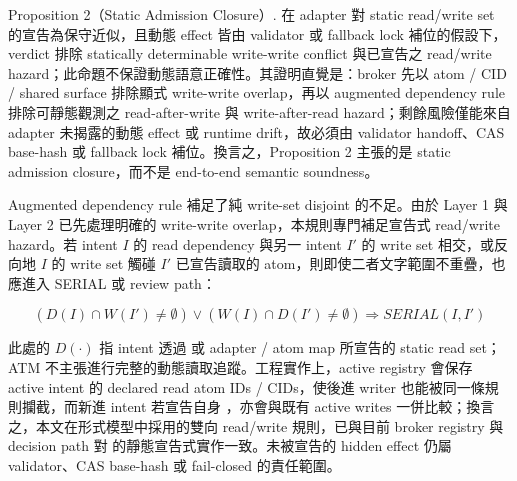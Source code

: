 \documentclass[a4paper,fontset=none]{ctexart}
\begin{document}
Proposition 2（Static Admission Closure）. 在 adapter 對 static read/write set 的宣告為保守近似，且動態 effect 皆由 validator 或 fallback lock 補位的假設下，\texttt{} verdict 排除 statically determinable write-write conflict 與已宣告之 read/write hazard；此命題不保證動態語意正確性。其證明直覺是：broker 先以 atom / CID / shared surface 排除顯式 write-write overlap，再以 augmented dependency rule 排除可靜態觀測之 read-after-write 與 write-after-read hazard；剩餘風險僅能來自 adapter 未揭露的動態 effect 或 runtime drift，故必須由 validator handoff、CAS base-hash 或 fallback lock 補位。換言之，Proposition 2 主張的是 static admission closure，而不是 end-to-end semantic soundness。

Augmented dependency rule 補足了純 write-set disjoint 的不足。由於 Layer 1 與 Layer 2 已先處理明確的 write-write overlap，本規則專門補足宣告式 read/write hazard。若 intent $I$ 的 read dependency 與另一 intent $I'$ 的 write set 相交，或反向地 $I$ 的 write set 觸碰 $I'$ 已宣告讀取的 atom，則即使二者文字範圍不重疊，也應進入 SERIAL 或 review path：

$$(D(I) \cap W(I') \neq \emptyset) \lor (W(I) \cap D(I') \neq \emptyset) \Rightarrow SERIAL(I, I')$$

此處的 $D(\cdot)$ 指 intent 透過 \texttt{} 或 adapter / atom map 所宣告的 static read set；ATM 不主張進行完整的動態讀取追蹤。工程實作上，active registry 會保存 active intent 的 declared read atom IDs / CIDs，使後進 writer 也能被同一條規則攔截，而新進 intent 若宣告自身 \texttt{}，亦會與既有 active writes 一併比較；換言之，本文在形式模型中採用的雙向 read/write 規則，已與目前 broker registry 與 decision path 對 \texttt{} 的靜態宣告式實作一致。未被宣告的 hidden effect 仍屬 validator、CAS base-hash 或 fail-closed 的責任範圍。
\end{document}
